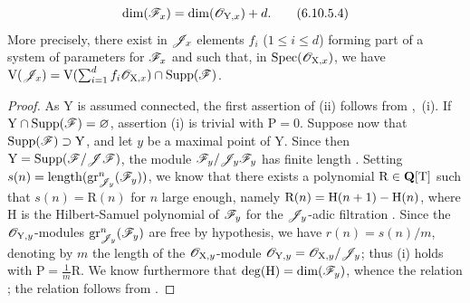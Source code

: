 \begin{proposition}[6.10.5]
\begin{enumerate}[label=\textup{(\roman*)}]
\end{enumerate}
\begin{equation}
  \dim(\mathscr{F}_x) = \dim(\mathscr{O}_{\mathrm{Y},x}) + d. \tag{6.10.5.4}\label{IV.6.10.5.4}
\end{equation}
More precisely, there exist in $\mathscr{J}_x$ elements $f_i$ ($1\leqslant i\leqslant d$) forming part of a system of parameters for $\mathscr{F}_x$  and such that, in $\operatorname{Spec}(\mathscr{O}_{\mathrm{X},x})$, we have $\mathrm{V}(\mathscr{J}_x)=\mathrm{V}(\sum_{i=1}^d f_i\mathscr{O}_{\mathrm{X},x})\cap\operatorname{Supp}(\mathscr{F})$.
\end{proposition}

\begin{proof}
As $\mathrm{Y}$ is assumed connected, the first assertion of (ii) follows from ,~(i). If $\mathrm{Y}\cap\operatorname{Supp}(\mathscr{F})=\varnothing$, assertion (i) is trivial with $\mathrm{P}=0$. Suppose now that $\operatorname{Supp}(\mathscr{F})\supset\mathrm{Y}$, and let $y$ be a maximal point of $\mathrm{Y}$. Since then $\mathrm{Y}=\operatorname{Supp}(\mathscr{F}/\mathscr{J}\mathscr{F})$, the module $\mathscr{F}_y/\mathscr{J}_y\mathscr{F}_y$ has finite length . Setting $s(n)=\operatorname{length}(\operatorname{gr}^n_{\mathscr{J}_y}(\mathscr{F}_y))$, we know that there exists a polynomial $\mathrm{R}\in\mathbf{Q}[\mathrm{T}]$ such that $s(n)=\mathrm{R}(n)$ for $n$ large enough, namely $\mathrm{R}(n)=\mathrm{H}(n+1)- \mathrm{H}(n)$, where $\mathrm{H}$ is the Hilbert-Samuel polynomial of $\mathscr{F}_y$ for the $\mathscr{J}_y$-adic filtration . Since the $\mathscr{O}_{\mathrm{Y},y}$-modules $\operatorname{gr}^n_{\mathscr{J}_y}(\mathscr{F}_y)$ are free by hypothesis, we have $r(n)=s(n)/m$, denoting by $m$ the length of the $\mathscr{O}_{\mathrm{X},y}$-module $\mathscr{O}_{\mathrm{Y},y}=\mathscr{O}_{\mathrm{X},y}/\mathscr{J}_y$; thus (i) holds with $\mathrm{P}=\frac{1}{m}\mathrm{R}$. We know furthermore  that $\deg(\mathrm{H})=\dim(\mathscr{F}_y)$, whence the relation ; the relation  follows from .


\end{proof}
